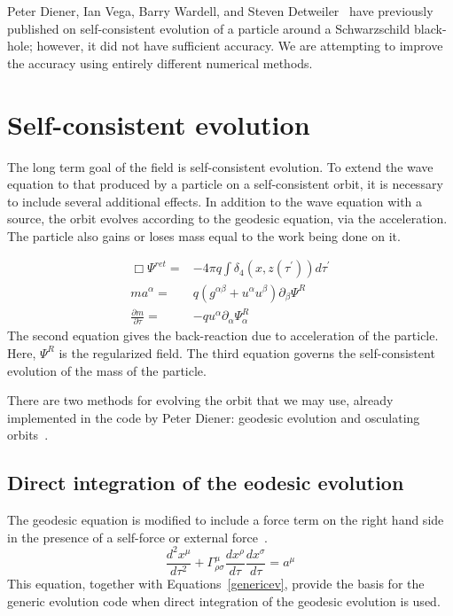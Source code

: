 Peter Diener, Ian Vega, Barry Wardell, and Steven Detweiler~\cite{diener_vega_wardell_detwieler_2012} have previously published on self-consistent evolution of a particle around a Schwarzschild black-hole; however, it did not have sufficient accuracy. We are attempting to improve the accuracy using entirely different numerical methods.

\section{Self-consistent evolution}



The long term goal of the field is self-consistent evolution. To extend the wave equation to that produced by a particle on a self-consistent orbit, it is necessary to include several additional effects. In addition to the wave equation with a source, the orbit evolves according to the geodesic equation, via the acceleration. The particle also gains or loses mass equal to the work being done on it. 

\begin{eqnarray}
  \Box\Psi^{ret} =& -4\pi q \int\delta_4(x,z(\tau^\prime))d\tau^\prime\nonumber\\
    ma^\alpha=&q(g^{\alpha\beta}+u^\alpha u^\beta)\partial_\beta\Psi^{R}\nonumber\\
    \frac{\partial m}{\partial \tau}=&-q u^\alpha\partial_\alpha \Psi^R_\alpha
    \label{genericev}
\end{eqnarray}
The second equation gives the back-reaction due to acceleration of the particle. Here, $\Psi^R$ is the regularized field. The third equation governs the self-consistent evolution of the mass of the particle.~\cite{WardellSelfForceReview}

There are two methods for evolving the orbit that we may use, already implemented in the code by Peter Diener: geodesic evolution and osculating orbits~\cite{pound_poisson}.

\subsection{Direct integration of the eodesic evolution}
The geodesic equation is modified to include a force term on the right hand side in the presence of a self-force or external force~\cite{Carroll}.
\begin{equation}
  \frac{d^2x^\mu}{d\tau^2}+\Gamma^\mu_{\rho\sigma}\frac{dx^\rho}{d\tau}\frac{dx^\sigma}{d\tau}=a^\mu
\end{equation}
This equation, together with Equations~\ref{genericev}, provide the basis for the generic evolution code when direct integration of the geodesic evolution is used. 

